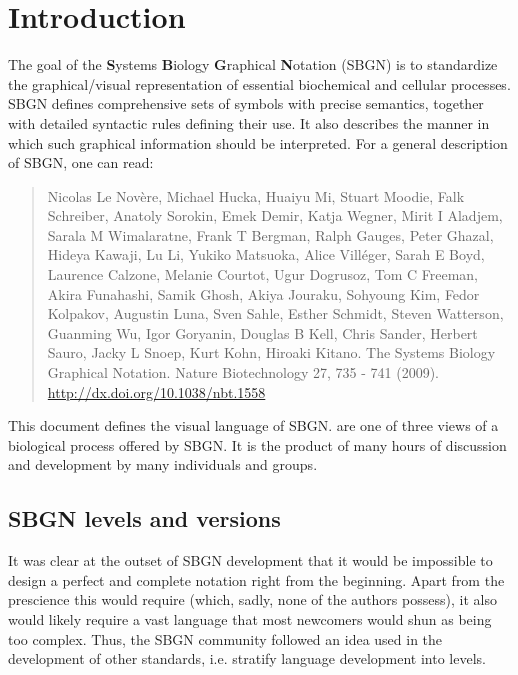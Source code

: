 
\chapter{Introduction}

The goal of the \textbf{S}ystems \textbf{B}iology \textbf{G}raphical \textbf{N}otation (SBGN) is to standardize the graphical/visual representation of essential biochemical and cellular processes. SBGN defines comprehensive sets of symbols with precise semantics, together with detailed syntactic rules defining their use.  It also describes the manner in which such graphical information should be interpreted. For a general description of SBGN, one can read:

\begin{quote}
 Nicolas Le Nov\`{e}re, Michael Hucka, Huaiyu Mi, Stuart Moodie, Falk Schreiber, Anatoly Sorokin, Emek Demir, Katja Wegner, Mirit I Aladjem, Sarala M Wimalaratne, Frank T Bergman, Ralph Gauges, Peter Ghazal, Hideya Kawaji, Lu Li, Yukiko Matsuoka, Alice Villéger, Sarah E Boyd, Laurence Calzone, Melanie Courtot, Ugur Dogrusoz, Tom C Freeman, Akira Funahashi, Samik Ghosh, Akiya Jouraku, Sohyoung Kim, Fedor Kolpakov, Augustin Luna, Sven Sahle, Esther Schmidt, Steven Watterson, Guanming Wu, Igor Goryanin, Douglas B Kell, Chris Sander, Herbert Sauro, Jacky L Snoep, Kurt Kohn, Hiroaki Kitano. The Systems Biology Graphical Notation. Nature Biotechnology 27, 735 - 741 (2009).  \url{http://dx.doi.org/10.1038/nbt.1558}
\end{quote}

This document defines the \emph{\ER{}} visual language of SBGN. \ERs are one of three views of a biological process offered by SBGN.  It is the product of many hours of discussion and development by many individuals and groups.  

\section{SBGN levels and versions}
\label{sec:sbgn-levels}

It was clear at the outset of SBGN development that it would be impossible to design a perfect and complete notation right from the beginning.  Apart from the prescience this would require (which, sadly, none of the authors possess), it also would likely require a vast language that most newcomers would shun as being too complex.  Thus, the SBGN community followed an idea used in the development of other standards, i.e. stratify language development into levels.


